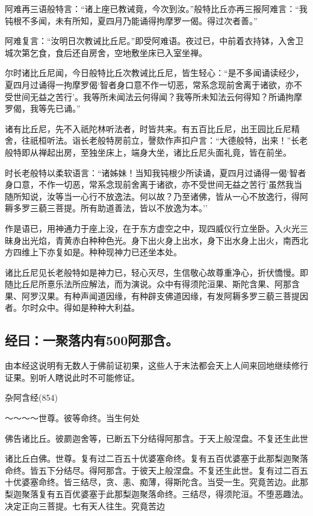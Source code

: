 \documentclass{book}
\begin{document}
阿难再三语般特言：``诸上座已教诫竟，今次到汝。''般特比丘亦再三报阿难言：``我钝根不多闻，未有所知，夏四月乃能诵得拘摩罗一偈。得过次者善。''

阿难复言：``汝明日次教诫比丘尼。''即受阿难语。夜过已，中前着衣持钵，入舍卫城次第乞食，食后还自房舍，空地敷坐床已入室坐禅。

尔时诸比丘尼闻，今日般特比丘次教诫比丘尼，皆生轻心：``是不多闻诵读经少，夏四月过诵得一拘摩罗偈`智者身口意不作一切恶，常系念现前舍离于诸欲，亦不受世间无益之苦行'。我等所未闻法云何得闻？我等所未知法云何得知？所诵拘摩罗偈，我等先已诵。''

诸有比丘尼，先不入祇陀林听法者，时皆共来。有五百比丘尼，出王园比丘尼精舍，往祇桓听法。诣长老般特房前立，謦欬作声扣户言：``大德般特，出来！''长老般特即从禅起出房，至独坐床上，端身大坐，诸比丘尼头面礼竟，皆在前坐。

时长老般特以柔软语言：``诸姊妹！当知我钝根少所读诵，夏四月过诵得一偈`智者身口意，不作一切恶，常系念现前舍离于诸欲，亦不受世间无益之苦行'虽然我当随所知说，汝等当一心行不放逸法。何以故？乃至诸佛，皆从一心不放逸行，得阿耨多罗三藐三菩提。所有助道善法，皆以不放逸为本。''

作是语已，用神通力于座上没，在于东方虚空之中，现四威仪行立坐卧。入火光三昧身出光焰，青黄赤白种种色光。身下出火身上出水，身下出水身上出火，南西北方四维上下亦复如是。种种现神力已还坐本处。

诸比丘尼见长老般特如是神力已，轻心灭尽，生信敬心故尊重净心，折伏憍慢。即随比丘尼所憙乐法所应解法，而为演说。众中有得须陀洹果、斯陀含果、阿那含果、阿罗汉果。有种声闻道因缘，有种辟支佛道因缘，有发阿耨多罗三藐三菩提因者。尔时众中。得如是种种大利益。

\subsection{经曰：一聚落内有500阿那含。}

由本经这说明有无数人于佛前证初果，这些人于末法都会天上人间来回地继续修行证果。别听人瞎说此时不可能修证。

杂阿含经(854)

～～～～世尊。彼等命终。当生何处

佛告诸比丘。彼罽迦舍等，已断五下分结得阿那含。于天上般涅盘。不复还生此世

诸比丘白佛。世尊。复有过二百五十优婆塞命终。复有五百优婆塞于此那梨迦聚落命终。皆五下分结尽。得阿那含。于彼天上般涅盘。不复还生此世。复有过二百五十优婆塞命终。皆三结尽，贪、恚、痴薄，得斯陀含。当受一生。究竟苦边。此那梨迦聚落复有五百优婆塞于此那梨迦聚落命终。三结尽，得须陀洹。不堕恶趣法。决定正向三菩提。七有天人往生。究竟苦边
\end{document}
